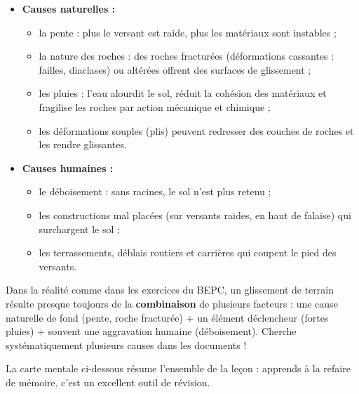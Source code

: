 \documentclass[11pt]{article}
\newcommand{\cle}[1]{{\popxbold\color{popdark}#1}}
\newcounter{popsec}
\newcounter{popsub}
\newcommand{\courssub}[1]{%
  \stepcounter{popsub}%
  \par\vspace{9pt}\noindent{\popxbold\fontsize{11.5}{13}\selectfont\color{popink}{\color{poporange}\thepopsec.\thepopsub}\hspace{6pt}#1}\par\nopagebreak\vspace{4pt}
}
\begin{document}
\begin{aretenir}
\begin{itemize}
\item \textbf{Causes naturelles :}
\begin{itemize}
\item la \cle{pente} : plus le versant est raide, plus les matériaux sont instables ;
\item la nature des \cle{roches} : des roches fracturées (déformations cassantes : failles, diaclases) ou altérées offrent des surfaces de glissement ;
\item les \cle{pluies} : l'eau alourdit le sol, réduit la cohésion des matériaux et fragilise les roches par action mécanique et chimique ;
\item les \cle{déformations souples} (plis) peuvent redresser des couches de roches et les rendre glissantes.
\end{itemize}
\item \textbf{Causes humaines :}
\begin{itemize}
\item le \cle{déboisement} : sans racines, le sol n'est plus retenu ;
\item les \cle{constructions} mal placées (sur versants raides, en haut de falaise) qui surchargent le sol ;
\item les terrassements, déblais routiers et carrières qui coupent le pied des versants.
\end{itemize}
\end{itemize}
\end{aretenir}

\begin{attention}
Dans la réalité comme dans les exercices du BEPC, un glissement de terrain résulte presque toujours de la \textbf{combinaison} de plusieurs facteurs : une cause naturelle de fond (pente, roche fracturée) + un élément déclencheur (fortes pluies) + souvent une aggravation humaine (déboisement). Cherche systématiquement plusieurs causes dans les documents !
\end{attention}

\courssub{Schéma-bilan de la leçon}

La carte mentale ci-dessous résume l'ensemble de la leçon : apprends à la refaire de mémoire, c'est un excellent outil de révision.
\end{document}
